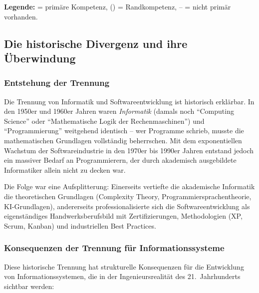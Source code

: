 ﻿\documentclass[a4paper,12pt]{article}
\theoremstyle{definition}
\begin{document}
\noindent
\textbf{Legende:} \checkmark = primäre Kompetenz, (\checkmark) = Randkompetenz, -- = nicht primär vorhanden.

\subsection{Die historische Divergenz und ihre Überwindung}

\subsubsection{Entstehung der Trennung}

Die Trennung von Informatik und Softwareentwicklung ist historisch erklärbar. In den
1950er und 1960er Jahren waren \emph{Informatik} (damals noch \enquote{Computing Science}
oder \enquote{Mathematische Logik der Rechenmaschinen}) und \enquote{Programmierung}
weitgehend identisch -- wer Programme schrieb, musste die mathematischen Grundlagen
vollständig beherrschen. Mit dem exponentiellen Wachstum der Softwareindustrie in
den 1970er bis 1990er Jahren entstand jedoch ein massiver Bedarf an Programmierern,
der durch akademisch ausgebildete Informatiker allein nicht zu decken war.

Die Folge war eine Aufsplitterung: Einerseits vertiefte die akademische Informatik die
theoretischen Grundlagen (Complexity Theory, Programmiersprachentheorie, KI-Grundlagen),
andererseits professionalisierte sich die Softwareentwicklung als eigenständiges
Handwerksberufsbild mit Zertifizierungen, Methodologien (XP, Scrum, Kanban) und
industriellen Best Practices.

\subsubsection{Konsequenzen der Trennung für Informationssysteme}

Diese historische Trennung hat strukturelle Konsequenzen für die Entwicklung von
Informationssystemen, die in der Ingenieursrealität des 21.~Jahrhunderts sichtbar werden:
\end{document}
